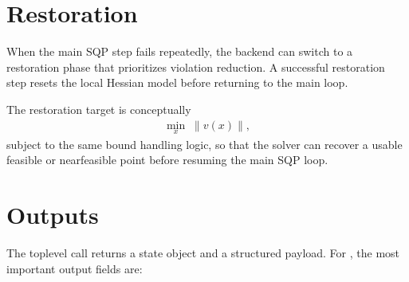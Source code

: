 \documentclass[letterpaper,10pt,english]{sphinxmanual}
\begin{document}
\section{Restoration}
\label{\detokenize{optima_sequential_qp:restoration}}
\sphinxAtStartPar
When the main SQP step fails repeatedly, the backend can switch to a restoration phase that prioritizes violation reduction. A successful restoration step resets the local Hessian model before returning to the main loop.

\sphinxAtStartPar
The restoration target is conceptually
\begin{equation*}
\begin{split}\min_x \; \|v(x)\|,\end{split}
\end{equation*}
\sphinxAtStartPar
subject to the same bound handling logic, so that the solver can recover a usable feasible or near\sphinxhyphen{}feasible point before resuming the main SQP loop.


\section{Outputs}
\label{\detokenize{optima_sequential_qp:outputs}}
\sphinxAtStartPar
The top\sphinxhyphen{}level  call returns a state object and a structured  payload. For , the most important output fields are:
\end{document}
